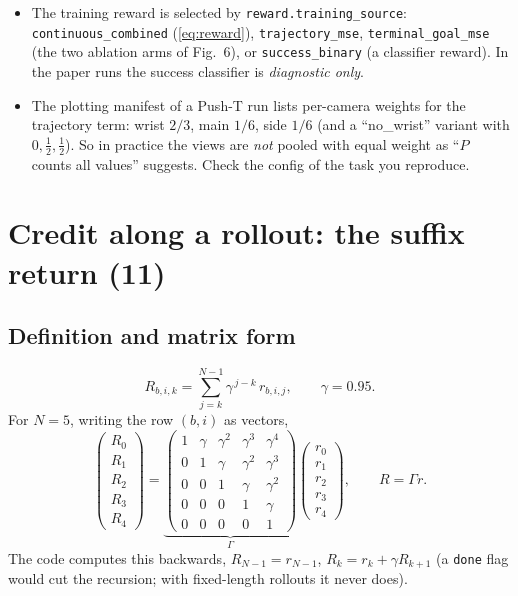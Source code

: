 \documentclass[11pt,a4paper]{article}
\newcommand{\R}{\mathbb{R}}
\newcommand{\eqp}[1]{\textup{(#1)}} %
\theoremstyle{remark}
\begin{document}
\begin{codenote}[(rewards)]
\begin{itemize}[leftmargin=*]
\item The training reward is selected by \texttt{reward.training\_source}: \texttt{continuous\_combined} (\eqref{eq:reward}), \texttt{trajectory\_mse}, \texttt{terminal\_goal\_mse} (the two ablation arms of Fig.~6), or \texttt{success\_binary} (a classifier reward). In the paper runs the success classifier is \emph{diagnostic only}.
\item The plotting manifest of a Push-T run lists per-camera weights for the trajectory term: wrist $2/3$, main $1/6$, side $1/6$ (and a ``no\_wrist'' variant with $0,\tfrac12,\tfrac12$). So in practice the views are \emph{not} pooled with equal weight as ``$P$ counts all values'' suggests. Check the config of the task you reproduce.
\end{itemize}
\end{codenote}

\section{Credit along a rollout: the suffix return \eqp{11}}

\subsection{Definition and matrix form}
\begin{equation}
R_{b,i,k}=\sum_{j=k}^{N-1}\gamma^{\,j-k}\,r_{b,i,j},\qquad \gamma=0.95.
\label{eq:return}
\end{equation}
For $N=5$, writing the row $(b,i)$ as vectors,
\begin{equation}
\begin{pmatrix}R_0\\R_1\\R_2\\R_3\\R_4\end{pmatrix}
=\underbrace{\begin{pmatrix}
1&\gamma&\gamma^2&\gamma^3&\gamma^4\\
0&1&\gamma&\gamma^2&\gamma^3\\
0&0&1&\gamma&\gamma^2\\
0&0&0&1&\gamma\\
0&0&0&0&1
\end{pmatrix}}_{\Gamma}
\begin{pmatrix}r_0\\r_1\\r_2\\r_3\\r_4\end{pmatrix},
\qquad R=\Gamma r .
\end{equation}
The code computes this backwards, $R_{N-1}=r_{N-1}$, $R_k=r_k+\gamma R_{k+1}$ (a \texttt{done} flag would cut the recursion; with fixed-length rollouts it never does).
\end{document}
